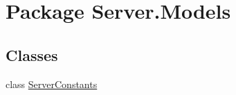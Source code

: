 \hypertarget{namespaceServer_1_1Models}{\section{Package Server.\-Models}
\label{namespaceServer_1_1Models}
}
\subsection*{Classes}
\begin{DoxyCompactItemize}
\item 
class \hyperlink{classServer_1_1Models_1_1ServerConstants}{Server\-Constants}
\end{DoxyCompactItemize}
